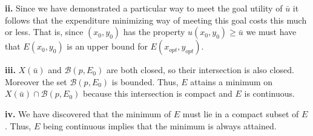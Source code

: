 \documentclass[12pt]{article}
\begin{document}
\textbf{ii.}  Since we have demonstrated a particular way to meet the goal utility of $\bar{u}$ it follows that the expenditure minimizing way of meeting this goal costs this much or less. That is, since $(x_0,y_0)$ has the property $u(x_0,y_0) \geq \bar{u}$ we must have that $E(x_0,y_0)$ is an upper bound for $E(x_{opt},y_{opt})$.

\textbf{iii.}  $X(\bar{u})$ and $ \mathcal{B}(p,E_0)$ are both closed, so their intersection is also closed. Moreover the set  $ \mathcal{B}(p,E_0)$  is bounded. Thus, $E$ attains a minimum on  $X(\bar{u}) \cap \mathcal{B}(p,E_0)$ because this intersection is compact and $E$ is continuous. 

\textbf{iv.} We have discovered that the minimum of $E$ must lie in a compact subset of $E$. Thus, $E$ being continuous implies that the minimum is always attained. 
\end{document}
